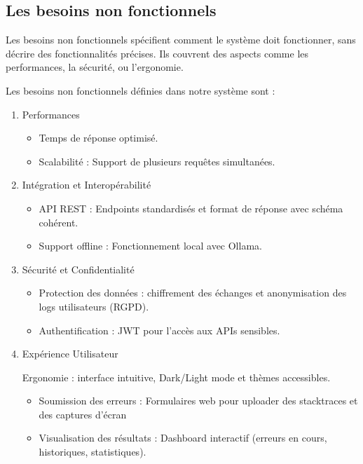 \documentclass[12pt,a4paper]{report}
\begin{document}
	\subsection{Les besoins non fonctionnels}
	
	Les besoins non fonctionnels spécifient comment le système doit fonctionner, sans décrire des fonctionnalités précises. Ils couvrent des aspects comme les performances, la sécurité, ou l’ergonomie.
	
	Les besoins non fonctionnels définies dans notre système sont :
	
	\begin{enumerate}
		
		\item Performances
		
		\begin{itemize}
			\item Temps de réponse optimisé.	
			\item Scalabilité : Support de plusieurs requêtes simultanées.
		\end{itemize}
		
		\item Intégration et Interopérabilité
		\begin{itemize}
			\item API REST : Endpoints standardisés et format de réponse avec schéma cohérent.
			\item Support offline : Fonctionnement local avec Ollama.
		\end{itemize}
		
		\item Sécurité et Confidentialité
		\begin{itemize}
			\item Protection des données : chiffrement des échanges et anonymisation des logs utilisateurs (RGPD).
			\item Authentification : JWT pour l’accès aux APIs sensibles.
		\end{itemize}
		
		\item Expérience Utilisateur
		
		Ergonomie : interface intuitive, Dark/Light mode et thèmes accessibles.
		\begin{itemize}
			\item Soumission des erreurs : Formulaires web pour uploader des stacktraces et des captures d'écran
			\item Visualisation des résultats : Dashboard interactif (erreurs en cours, historiques, statistiques).
		\end{itemize}
		
	\end{enumerate}
	
\end{document}
